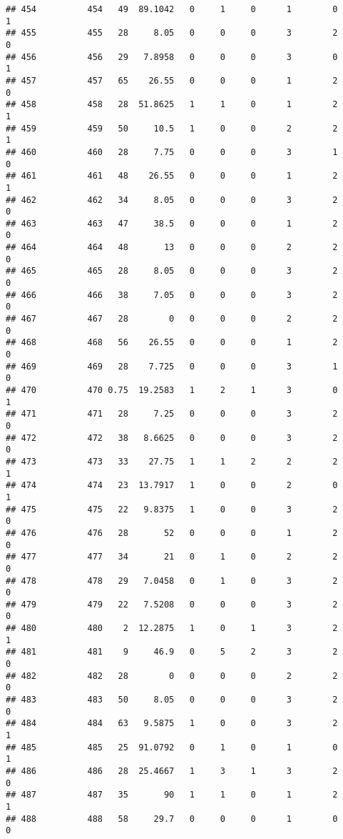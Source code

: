 \documentclass[
]{article}
\begin{document}
\begin{verbatim}
## 454          454   49  89.1042   0     1     0      1        0         1
## 455          455   28     8.05   0     0     0      3        2         0
## 456          456   29   7.8958   0     0     0      3        0         1
## 457          457   65    26.55   0     0     0      1        2         0
## 458          458   28  51.8625   1     1     0      1        2         1
## 459          459   50     10.5   1     0     0      2        2         1
## 460          460   28     7.75   0     0     0      3        1         0
## 461          461   48    26.55   0     0     0      1        2         1
## 462          462   34     8.05   0     0     0      3        2         0
## 463          463   47     38.5   0     0     0      1        2         0
## 464          464   48       13   0     0     0      2        2         0
## 465          465   28     8.05   0     0     0      3        2         0
## 466          466   38     7.05   0     0     0      3        2         0
## 467          467   28        0   0     0     0      2        2         0
## 468          468   56    26.55   0     0     0      1        2         0
## 469          469   28    7.725   0     0     0      3        1         0
## 470          470 0.75  19.2583   1     2     1      3        0         1
## 471          471   28     7.25   0     0     0      3        2         0
## 472          472   38   8.6625   0     0     0      3        2         0
## 473          473   33    27.75   1     1     2      2        2         1
## 474          474   23  13.7917   1     0     0      2        0         1
## 475          475   22   9.8375   1     0     0      3        2         0
## 476          476   28       52   0     0     0      1        2         0
## 477          477   34       21   0     1     0      2        2         0
## 478          478   29   7.0458   0     1     0      3        2         0
## 479          479   22   7.5208   0     0     0      3        2         0
## 480          480    2  12.2875   1     0     1      3        2         1
## 481          481    9     46.9   0     5     2      3        2         0
## 482          482   28        0   0     0     0      2        2         0
## 483          483   50     8.05   0     0     0      3        2         0
## 484          484   63   9.5875   1     0     0      3        2         1
## 485          485   25  91.0792   0     1     0      1        0         1
## 486          486   28  25.4667   1     3     1      3        2         0
## 487          487   35       90   1     1     0      1        2         1
## 488          488   58     29.7   0     0     0      1        0         0

\end{verbatim}
\end{document}
